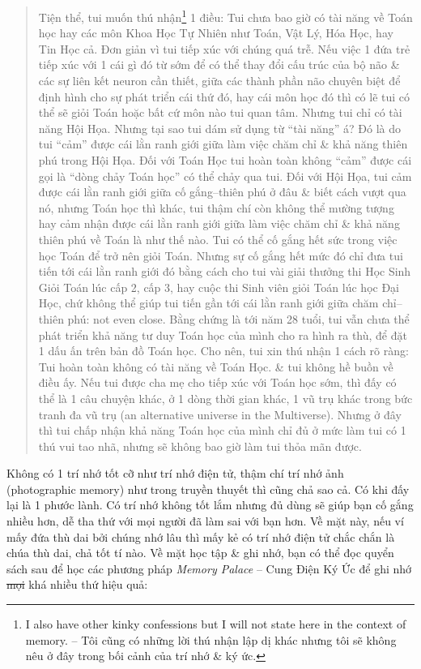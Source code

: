 \documentclass[12pt,twoside]{book}
\begin{document}
\begin{quote}
	Tiện thể, tui muốn thú nhận\footnote{I also have other kinky confessions but I will not state here in the context of memory. -- Tôi cũng có những lời thú nhận lập dị khác nhưng tôi sẽ không nêu ở đây trong bối cảnh của trí nhớ \& ký ức.} 1 điều: Tui chưa bao giờ có tài năng về Toán học hay các môn Khoa Học Tự Nhiên như Toán, Vật Lý, Hóa Học, hay Tin Học cả. Đơn giản vì tui tiếp xúc với chúng quá trễ. Nếu việc 1 đứa trẻ tiếp xúc với 1 cái gì đó từ sớm để có thể thay đổi cấu trúc của bộ não \& các sự liên kết neuron cần thiết, giữa các thành phần não chuyên biệt để định hình cho sự phát triển cái thứ đó, hay cái môn học đó thì có lẽ tui có thể sẽ giỏi Toán hoặc bất cứ môn nào tui quan tâm. Nhưng tui chỉ có tài năng Hội Họa. Nhưng tại sao tui dám sử dụng từ ``tài năng'' á? Đó là do tui ``cảm'' được cái lằn ranh giới giữa làm việc chăm chỉ \& khả năng thiên phú trong Hội Họa. Đối với Toán Học tui hoàn toàn không ``cảm'' được cái gọi là ``dòng chảy Toán học'' có thể chảy qua tui. Đối với Hội Họa, tui cảm được cái lằn ranh giới giữa cố gắng--thiên phú ở đâu \& biết cách vượt qua nó, nhưng Toán học thì khác, tui thậm chí còn không thể mường tượng hay cảm nhận được cái lằn ranh giới giữa làm việc chăm chỉ \& khả năng thiên phú về Toán là như thế nào. Tui có thể cố gắng hết sức trong việc học Toán để trở nên giỏi Toán. Nhưng sự cố gắng hết mức đó chỉ đưa tui tiến tới cái lằn ranh giới đó bằng cách cho tui vài giải thưởng thi Học Sinh Giỏi Toán lúc cấp 2, cấp 3, hay cuộc thi Sinh viên giỏi Toán lúc học Đại Học, chứ không thể giúp tui tiến gần tới cái lằn ranh giới giữa chăm chỉ--thiên phú: not even close. Bằng chứng là tới năm 28 tuổi, tui vẫn chưa thể phát triển khả năng tư duy Toán học của mình cho ra hình ra thù, để đặt 1 dấu ấn trên bản đồ Toán học. Cho nên, tui xin thú nhận 1 cách rõ ràng: Tui hoàn toàn không có tài năng về Toán Học. \& tui không hề buồn về điều ấy. Nếu tui được cha mẹ cho tiếp xúc với Toán học sớm, thì đấy có thể là 1 câu chuyện khác, ở 1 dòng thời gian khác, 1 vũ trụ khác trong bức tranh đa vũ trụ (an alternative universe in the Multiverse). Nhưng ở đây thì tui chấp nhận khả năng Toán học của mình chỉ đủ ở mức làm tui có 1 thú vui tao nhã, nhưng sẽ không bao giờ làm tui thỏa mãn được.
\end{quote}
Không có 1 trí nhớ tốt cỡ như trí nhớ điện tử, thậm chí trí nhớ ảnh (photographic memory) như trong truyền thuyết thì cũng chả sao cả. Có khi đấy lại là 1 phước lành. Có trí nhớ không tốt lắm nhưng đủ dùng sẽ giúp bạn cố gắng nhiều hơn, dễ tha thứ với mọi người đã làm sai với bạn hơn. Về mặt này, nếu ví mấy đứa thù dai bởi chúng nhớ lâu thì mấy kẻ có trí nhớ điện tử chắc chắn là chúa thù dai, chả tốt tí nào. Về mặt học tập \& ghi nhớ, bạn có thể đọc quyển sách sau để học các phương pháp {\it Memory Palace} -- Cung Điện Ký Ức để ghi nhớ \st{mọi} khá nhiều thứ hiệu quả:
\end{document}
